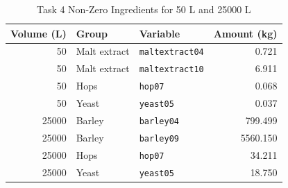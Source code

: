 \begin{table}[H]
\renewcommand{\arraystretch}{1.12}
\caption{Task 4 Non-Zero Ingredients for 50 L and 25000 L}
\label{tab:task34-nonzero-ingredients}
\centering
\small
\begin{tabular}{@{}rllr@{}}
\toprule
Volume (L) & Group & Variable & Amount (kg) \\
\midrule
50 & Malt extract & \texttt{maltextract04} & 0.721 \\
50 & Malt extract & \texttt{maltextract10} & 6.911 \\
50 & Hops & \texttt{hop07} & 0.068 \\
50 & Yeast & \texttt{yeast05} & 0.037 \\
25000 & Barley & \texttt{barley04} & 799.499 \\
25000 & Barley & \texttt{barley09} & 5560.150 \\
25000 & Hops & \texttt{hop07} & 34.211 \\
25000 & Yeast & \texttt{yeast05} & 18.750 \\
\bottomrule
\end{tabular}
\end{table}
